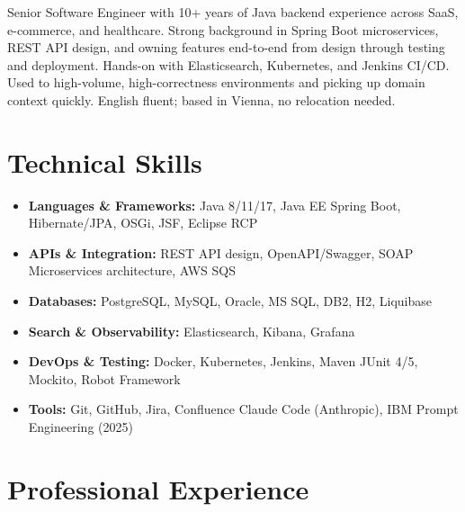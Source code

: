 \documentclass[10pt,a4paper,sans]{moderncv}
\begin{document}
\makecvtitle
\vspace{-10pt}

\small{Senior Software Engineer with 10+ years of Java backend experience across SaaS, e-commerce, and healthcare. Strong background in Spring Boot microservices, REST API design, and owning features end-to-end from design through testing and deployment. Hands-on with Elasticsearch, Kubernetes, and Jenkins CI/CD. Used to high-volume, high-correctness environments and picking up domain context quickly. English fluent; based in Vienna, no relocation needed.}

\vspace{2pt}

\section{Technical Skills}
\vspace{1pt}
\begin{itemize}
  \item \textbf{Languages \& Frameworks:} Java 8/11/17, Java EE \textbar{} Spring Boot, Hibernate/JPA, OSGi, JSF, Eclipse RCP
  \item \textbf{APIs \& Integration:} REST API design, OpenAPI/Swagger, SOAP \textbar{} Microservices architecture, AWS SQS
  \item \textbf{Databases:} PostgreSQL, MySQL, Oracle, MS SQL, DB2, H2, Liquibase
  \item \textbf{Search \& Observability:} Elasticsearch, Kibana, Grafana
  \item \textbf{DevOps \& Testing:} Docker, Kubernetes, Jenkins, Maven \textbar{} JUnit 4/5, Mockito, Robot Framework
  \item \textbf{Tools:} Git, GitHub, Jira, Confluence \textbar{} Claude Code (Anthropic), IBM Prompt Engineering (2025)
\end{itemize}

\section{Professional Experience}
\vspace{1pt}
\end{document}
